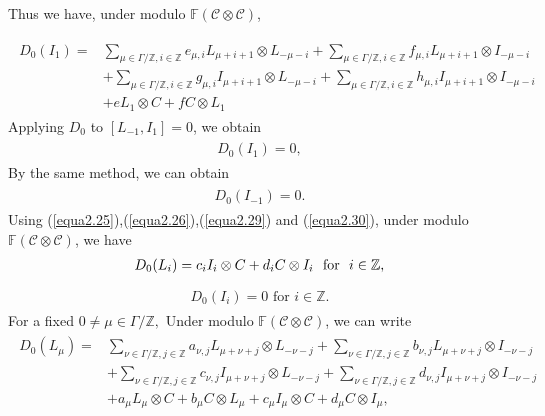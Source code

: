 \documentclass{amsart}
\theoremstyle{definition}
\theoremstyle{remark}
\numberwithin{equation}{subsection}
\numberwithin{equation}{section}
\begin{document}
Thus we have, under modulo $\mathbb{F}(\mathcal {C}\otimes \mathcal
{C})$,

\begin{eqnarray}\label{equa2.28}
\begin{split}
D_0(I_{1})=&\underset{\mu\in \Gamma/\mathbb{Z},i\in
\mathbb{Z}}{\sum}{e_{\mu,i} L_{\mu+i+ 1} \otimes L_{-\mu-i}}+
\underset{\mu\in \Gamma/\mathbb{Z},i\in \mathbb{Z}}{\sum}{f_{\mu,i}
L_{\mu+i+1} \otimes I_{-\mu-i}}\\
&+\underset{\mu\in \Gamma/\mathbb{Z},i\in
\mathbb{Z}}{\sum}{g_{\mu,i} I_{\mu+i+ 1} \otimes L_{-\mu-i}}+
\underset{\mu\in \Gamma/\mathbb{Z},i\in \mathbb{Z}}{\sum}{h_{\mu,i}
I_{\mu+i+ 1} \otimes I_{-\mu-i}}\\ &+ e L_{1}\otimes C+f C \otimes
L_{1}
\end{split}
\end{eqnarray}
Applying $D_0$ to $[L_{-1},I_1]=0$, we obtain
\begin{eqnarray}\label{equa2.29}
\begin{split}
D_0(I_{1})=0,
\end{split}
\end{eqnarray}
By the same method, we can obtain
\begin{eqnarray}\label{equa2.30}
\begin{split}
D_0(I_{-1})=0.
\end{split}
\end{eqnarray}
Using (\ref{equa2.25}),(\ref{equa2.26}),(\ref{equa2.29}) and
(\ref{equa2.30}), under modulo $\mathbb{F}(\mathcal {C}\otimes
\mathcal {C})$, we have
\begin{eqnarray}\label{equa2.31}
\begin{split}
D_0(L_{ i})= c_{i}I_{ i}\otimes C +d_{i}C \otimes I_{ i} \mbox { \
for \ } i\in \mathbb{Z},
\end{split}
\end{eqnarray}
\begin{eqnarray}\label{equa2.32}
\begin{split}
D_0(I_{i})=0  \mbox { \ for \ } i\in \mathbb{Z}.
\end{split}
\end{eqnarray}
For a fixed $0\neq \mu \in \Gamma/\mathbb{Z},$  Under modulo
$\mathbb{F}(\mathcal {C} \otimes \mathcal {C})$, we can write
 \begin{eqnarray}\label{equa2.33}
 \begin{split}
 D_0(L_{\mu})=&\underset{\nu\in \Gamma/\mathbb{Z},j\in
 \mathbb{Z}}{\sum}{a_{\nu,j} L_{\mu+\nu+j} \otimes
 L_{-\nu-j}}+\underset{\nu\in \Gamma/\mathbb{Z},j\in
 \mathbb{Z}}{\sum}{b_{\nu,j} L_{\mu+\nu+j} \otimes
 I_{-\nu-j}}   \\&
 +\underset{\nu\in \Gamma/\mathbb{Z},j\in
 \mathbb{Z}}{\sum}{c_{\nu,j} I_{\mu+\nu+j} \otimes
 L_{-\nu-j}}+\underset{\nu\in \Gamma/\mathbb{Z},j\in
 \mathbb{Z}}{\sum}{d_{\nu,j} I_{\mu+\nu+j} \otimes
 I_{-\nu-j}}   \\&
 + a_{\mu}L_{\mu}\otimes
 C+b_{\mu}C \otimes L_{\mu}
 +c_{\mu}I_{\mu}\otimes C  +d_{\mu}C \otimes
 I_{\mu},
 \end{split}
\end{eqnarray}
\end{document}
